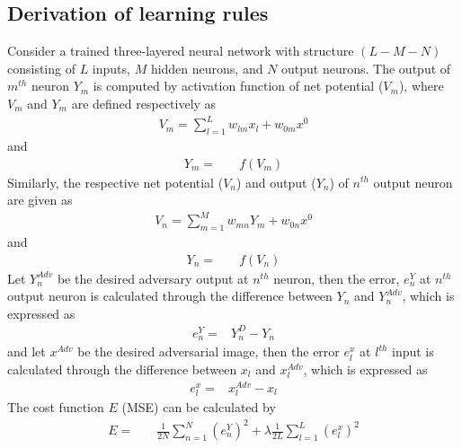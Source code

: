 
\appendixtitleon
\begin{appendices}
    \setcounter{equation}{0}


    \section*{Derivation of learning rules}\label{apendix:derivation_of_learning_rule} 

        Consider a trained three-layered neural network with structure $(L-M-N)$ consisting of $L$ inputs, $M$ hidden neurons, and $N$ output neurons. The output of $m^{th}$ neuron $Y_m$ is computed by activation function of net potential ($V_m$), where $V_m$ and $Y_m$ are defined respectively as
        \begin{align} \label{eqn:Vm}
            V_m =  \sum \limits_{l=1}^{L} w_{lm}x_{l} + w_{0m}x^{0}
        \end{align} and	
        \begin{align}\label{eqn:Ym}	
            Y_m =&\quad f(V_m)
        \end{align}
        Similarly, the respective net potential ($V_n$) and output ($Y_n$) of $n^{th}$ output neuron are given as
        \begin{align}\label{eqn:Vn}
            V_n =\sum \limits_{m=1}^{M} w_{mn}Y_{m} + w_{0n}x^{0} 
        \end{align} and 
        \begin{align} \label{eqn:Yn}
            Y_n =& \quad f(V_n)  
        \end{align}
        Let $Y_n^{Adv}$ be the desired adversary output at $n^{th}$ neuron, then the error, $e_n^Y$ at $n^{th}$ output neuron is calculated through the difference between $Y_n$ and $Y_n^{Adv}$, which is expressed as
        \begin{align} \label{eqn:eny} 
            e_n^Y =& Y_n^D - Y_n
        \end{align} 
        and let $x^{Adv}$ be the desired adversarial image, then the error $e_l^x$ at $l^{th}$ input is calculated through the difference between $x_l$ and $x_l^{Adv}$, which is expressed as
        \begin{align} \label{eqn:enx} 
            e_l^x =& x_l^{Adv} - x_l
        \end{align} 
        The cost function $E$ (MSE) can be calculated by
        \begin{align} \label{eqn:mse}
            E =& \quad \frac{1}{2N} \sum \limits_{n=1}^{N} (e_n^Y)^{2} + \lambda \frac{1}{2L} \sum \limits_{l=1}^{L} (e_l^x)^{2}
        \end{align}
         

\end{appendices}
